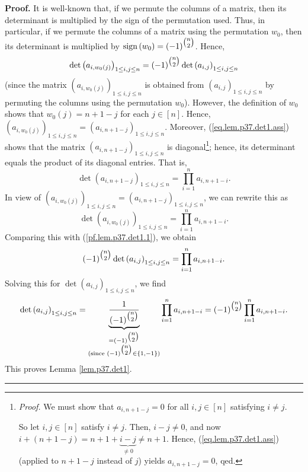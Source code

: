 \documentclass[numbers=enddot,12pt,final,onecolumn,notitlepage]{scrartcl}%
\theoremstyle{definition}
\newenvironment{proof}[1][Proof]{\noindent\textbf{#1.} }{\ \rule{0.5em}{0.5em}}
\let\prodnonlimits\prod
\renewcommand{\prod}{\prodnonlimits\limits}
\begin{document}
\begin{enumerate}
\begin{proof}
It is well-known that, if we permute the columns of a matrix, then its
determinant is multiplied by the sign of the permutation used. Thus, in
particular, if we permute the columns of a matrix using the permutation
$w_{0}$, then its determinant is multiplied by $\operatorname*{sign}\left(
w_{0}\right)  =\left(  -1\right)  ^{\tbinom{n}{2}}$. Hence,%
\begin{equation}
\det\left(  a_{i,w_{0}\left(  j\right)  }\right)  _{1\leq i,j\leq n}=\left(
-1\right)  ^{\tbinom{n}{2}}\det\left(  a_{i,j}\right)  _{1\leq i,j\leq n}
\label{pf.lem.p37.det1.1}%
\end{equation}
(since the matrix $\left(  a_{i,w_{0}\left(  j\right)  }\right)  _{1\leq
i,j\leq n}$ is obtained from $\left(  a_{i,j}\right)  _{1\leq i,j\leq n}$ by
permuting the columns using the permutation $w_{0}$). However, the definition
of $w_{0}$ shows that $w_{0}\left(  j\right)  =n+1-j$ for each $j\in\left[
n\right]  $. Hence, $\left(  a_{i,w_{0}\left(  j\right)  }\right)  _{1\leq
i,j\leq n}=\left(  a_{i,n+1-j}\right)  _{1\leq i,j\leq n}$. Moreover,
(\ref{eq.lem.p37.det1.ass}) shows that the matrix $\left(  a_{i,n+1-j}\right)
_{1\leq i,j\leq n}$ is diagonal\footnote{\textit{Proof.} We must show that
$a_{i,n+1-j}=0$ for all $i,j\in\left[  n\right]  $ satisfying $i\neq j$.
\par
So let $i,j\in\left[  n\right]  $ satisfy $i\neq j$. Then, $i-j\neq0$, and now
$i+\left(  n+1-j\right)  =n+1+\underbrace{i-j}_{\neq0}\neq n+1$. Hence,
(\ref{eq.lem.p37.det1.ass}) (applied to $n+1-j$ instead of $j$) yields
$a_{i,n+1-j}=0$, qed.}; hence, its determinant equals the product of its
diagonal entries. That is,%
\[
\det\left(  a_{i,n+1-j}\right)  _{1\leq i,j\leq n}=\prod_{i=1}^{n}%
a_{i,n+1-i}.
\]
In view of $\left(  a_{i,w_{0}\left(  j\right)  }\right)  _{1\leq i,j\leq
n}=\left(  a_{i,n+1-j}\right)  _{1\leq i,j\leq n}$, we can rewrite this as%
\[
\det\left(  a_{i,w_{0}\left(  j\right)  }\right)  _{1\leq i,j\leq n}%
=\prod_{i=1}^{n}a_{i,n+1-i}.
\]
Comparing this with (\ref{pf.lem.p37.det1.1}), we obtain%
\[
\left(  -1\right)  ^{\tbinom{n}{2}}\det\left(  a_{i,j}\right)  _{1\leq i,j\leq
n}=\prod_{i=1}^{n}a_{i,n+1-i}.
\]
Solving this for $\det\left(  a_{i,j}\right)  _{1\leq i,j\leq n}$, we find%
\[
\det\left(  a_{i,j}\right)  _{1\leq i,j\leq n}=\underbrace{\dfrac{1}{\left(
-1\right)  ^{\tbinom{n}{2}}}}_{\substack{=\left(  -1\right)  ^{\tbinom{n}{2}%
}\\\text{(since }\left(  -1\right)  ^{\tbinom{n}{2}}\in\left\{  1,-1\right\}
\text{)}}}\prod_{i=1}^{n}a_{i,n+1-i}=\left(  -1\right)  ^{\tbinom{n}{2}}%
\prod_{i=1}^{n}a_{i,n+1-i}.
\]
This proves Lemma \ref{lem.p37.det1}.
\end{proof}


\end{enumerate}
\end{document}
